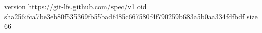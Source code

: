 version https://git-lfs.github.com/spec/v1
oid sha256:fca7be3eb80f535369fb55badf485c667580f4f790259b683a5b0aa334fdfbdf
size 66
